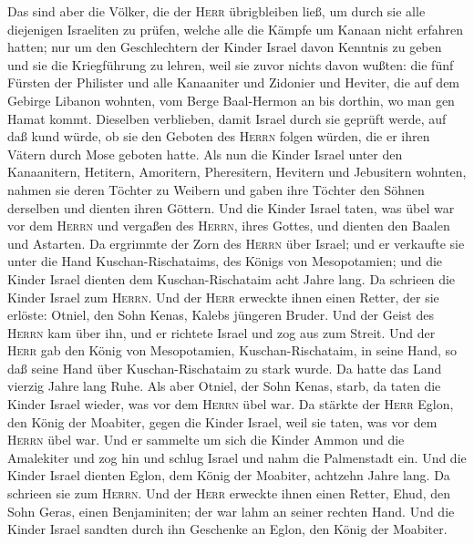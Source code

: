  Das sind aber die Völker, die der \textsc{Herr}
übrigbleiben ließ, um durch sie alle diejenigen Israeliten zu prüfen,
welche alle die Kämpfe um Kanaan nicht erfahren hatten; 
nur um den Geschlechtern der Kinder Israel davon Kenntnis zu geben und
sie die Kriegführung zu lehren, weil sie zuvor nichts davon wußten:
 die fünf Fürsten der Philister und alle Kanaaniter und
Zidonier und Heviter, die auf dem Gebirge Libanon wohnten, vom Berge
Baal-Hermon an bis dorthin, wo man gen Hamat kommt. 
Dieselben verblieben, damit Israel durch sie geprüft werde, auf daß kund
würde, ob sie den Geboten des \textsc{Herrn} folgen würden, die er ihren
Vätern durch Mose geboten hatte.  Als nun die Kinder
Israel unter den Kanaanitern, Hetitern, Amoritern, Pheresitern, Hevitern
und Jebusitern wohnten,  nahmen sie deren Töchter zu
Weibern und gaben ihre Töchter den Söhnen derselben und dienten ihren
Göttern.  Und die Kinder Israel taten, was übel war vor
dem \textsc{Herrn} und vergaßen des \textsc{Herrn}, ihres Gottes, und
dienten den Baalen und Astarten.  Da ergrimmte der Zorn
des \textsc{Herrn} über Israel; und er verkaufte sie unter die Hand
Kuschan-Rischataims, des Königs von Mesopotamien; und die Kinder Israel
dienten dem Kuschan-Rischataim acht Jahre lang.  Da
schrieen die Kinder Israel zum \textsc{Herrn}. Und der \textsc{Herr}
erweckte ihnen einen Retter, der sie erlöste: Otniel, den Sohn Kenas,
Kalebs jüngeren Bruder.  Und der Geist des \textsc{Herrn}
kam über ihn, und er richtete Israel und zog aus zum Streit. Und der
\textsc{Herr} gab den König von Mesopotamien, Kuschan-Rischataim, in
seine Hand, so daß seine Hand über Kuschan-Rischataim zu stark wurde.
 Da hatte das Land vierzig Jahre lang Ruhe. Als aber
Otniel, der Sohn Kenas, starb,  da taten die Kinder
Israel wieder, was vor dem \textsc{Herrn} übel war. Da stärkte der
\textsc{Herr} Eglon, den König der Moabiter, gegen die Kinder Israel,
weil sie taten, was vor dem \textsc{Herrn} übel war.  Und
er sammelte um sich die Kinder Ammon und die Amalekiter und zog hin und
schlug Israel und nahm die Palmenstadt ein.  Und die
Kinder Israel dienten Eglon, dem König der Moabiter, achtzehn Jahre
lang.  Da schrieen sie zum \textsc{Herrn}. Und der
\textsc{Herr} erweckte ihnen einen Retter, Ehud, den Sohn Geras, einen
Benjaminiten; der war lahm an seiner rechten Hand. Und die Kinder Israel
sandten durch ihn Geschenke an Eglon, den König der Moabiter.
